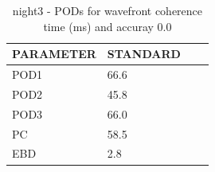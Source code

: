 \begin{table}[p!]
\begin{center}
\begin{tabular}{|l|l|l|l|}
\hline
\multicolumn{1}{|c|}{\cellcolor[HTML]{C0C0C0}\textbf{PARAMETER}} & \multicolumn{1}{c|}{\cellcolor[HTML]{C0C0C0}\textbf{STANDARD}} \\
\hline
\cellcolor[HTML]{C0C0C0}POD1  & 66.6                                \\
\cellcolor[HTML]{C0C0C0}POD2  & 45.8                                \\
\cellcolor[HTML]{C0C0C0}POD3  & 66.0                                \\
\cellcolor[HTML]{C0C0C0}PC    & 58.5                                  \\
\cellcolor[HTML]{C0C0C0}EBD   & 2.8                                 \\
\hline
\end{tabular}
\caption{night3 - PODs for wavefront coherence time (ms) and accuray 0.0}
\label{tab:podtau0.0:night3}
\end{center}
\end{table}
